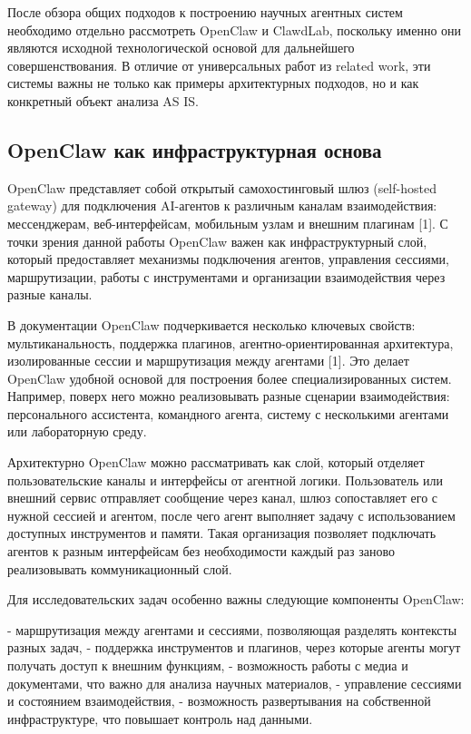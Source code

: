 После обзора общих подходов к построению научных агентных систем необходимо отдельно рассмотреть OpenClaw и ClawdLab, поскольку именно они являются исходной технологической основой для дальнейшего совершенствования. В отличие от универсальных работ из related work, эти системы важны не только как примеры архитектурных подходов, но и как конкретный объект анализа AS IS.

\subsection{OpenClaw как инфраструктурная основа}

OpenClaw представляет собой открытый самохостинговый шлюз (self-hosted gateway) для подключения AI-агентов к различным каналам взаимодействия: мессенджерам, веб-интерфейсам, мобильным узлам и внешним плагинам [1]. С точки зрения данной работы OpenClaw важен как инфраструктурный слой, который предоставляет механизмы подключения агентов, управления сессиями, маршрутизации, работы с инструментами и организации взаимодействия через разные каналы.

В документации OpenClaw подчеркивается несколько ключевых свойств: мультиканальность, поддержка плагинов, агентно-ориентированная архитектура, изолированные сессии и маршрутизация между агентами [1]. Это делает OpenClaw удобной основой для построения более специализированных систем. Например, поверх него можно реализовывать разные сценарии взаимодействия: персонального ассистента, командного агента, систему с несколькими агентами или лабораторную среду.

Архитектурно OpenClaw можно рассматривать как слой, который отделяет пользовательские каналы и интерфейсы от агентной логики. Пользователь или внешний сервис отправляет сообщение через канал, шлюз сопоставляет его с нужной сессией и агентом, после чего агент выполняет задачу с использованием доступных инструментов и памяти. Такая организация позволяет подключать агентов к разным интерфейсам без необходимости каждый раз заново реализовывать коммуникационный слой.

Для исследовательских задач особенно важны следующие компоненты OpenClaw:

- маршрутизация между агентами и сессиями, позволяющая разделять контексты разных задач,
- поддержка инструментов и плагинов, через которые агенты могут получать доступ к внешним функциям,
- возможность работы с медиа и документами, что важно для анализа научных материалов,
- управление сессиями и состоянием взаимодействия,
- возможность развертывания на собственной инфраструктуре, что повышает контроль над данными.

